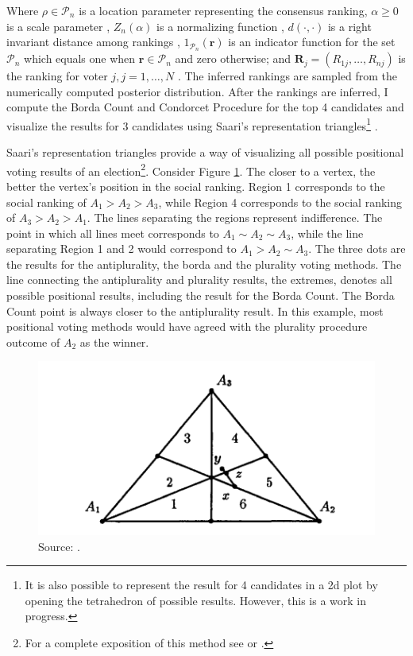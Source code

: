 \documentclass[hidelinks,11pt]{article}
\begin{document}
Where $\rho \in \mathcal{P}_{n}$ is a location parameter representing the consensus ranking, $\alpha \geq 0$ is a scale parameter , $Z_{n}(\alpha)$ is a normalizing function , $d(\cdot, \cdot)$ is a right invariant distance among rankings ,  $1_{\mathcal{P}_{n}}(\mathbf{r})$ is an indicator function for the set $\mathcal{P}_{n}$ which equals one when $\mathbf{r} \in \mathcal{P}_{n}$ and zero otherwise; and $\mathbf{R}_{j}=\left(R_{1 j}, \ldots, R_{n j}\right)$ is the ranking for voter $j, j=1, \ldots, N$ \parencite{sorensen2019bayesmallows}. The inferred rankings are sampled from the numerically computed posterior
distribution. After the rankings are inferred, I compute the Borda Count and Condorcet Procedure for the top
4 candidates and visualize the results for 3 candidates using Saari's representation triangles\footnote{It is also possible to represent the result for 4 candidates in a 2d plot by opening the tetrahedron of possible results\parencite{saari2001chaotic}. However, this is a work in progress.} \parencite{saari2012geometry}.

Saari's representation triangles provide a way of visualizing all possible
positional voting results of an election\footnote{For a complete exposition of
  this method see \textcite{saari1995basic} or \textcite{nurmi2002voting}.}. Consider Figure \ref{fig:saari_nurmi}. The closer to a vertex, the better the vertex's position in the social ranking. Region 1 corresponds to the social ranking of \(A_{1} > A_{2} > A_{3}\), while Region 4 corresponds to the social ranking of \(A_{3}>A_{2}>A_{1}\). The lines separating the regions represent indifference. The point in which all lines meet corresponds to \(A_{1} \sim A_{2} \sim A_{3}\), while the line separating Region 1 and 2 would correspond to \(A_{1} > A_{2} \sim A_{3}\). The three dots are the results for the antiplurality, the borda and the plurality voting methods. The line connecting the antiplurality and plurality results, the extremes, denotes all possible positional results, including the result for the Borda Count. The Borda Count point is always closer to the antiplurality result. In this example, most positional voting methods would have agreed with the plurality procedure outcome of \(A_{2}\) as the winner.

\begin{figure}[H]
 \centering
 \includegraphics[width=\columnwidth,
 height=0.3\textheight]{./images/saari_triangle.png}
 \caption{Source: \textcite{nurmi2002voting}.}
 \label{fig:saari_nurmi}
\end{figure}
\end{document}

